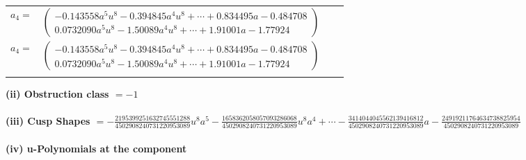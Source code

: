 \documentclass[1p]{elsarticle_modified}
\theoremstyle{definition}
\begin{document}
\begin{tabular}{m{7pt} m{180pt} m{7pt} m{180pt} }
\flushright $a_{4}=$&$\begin{pmatrix}-0.143558 a^{5} u^{8}-0.394845 a^{4} u^{8}+\cdots+0.834495 a-0.484708\\0.0732090 a^{5} u^{8}-1.50089 a^{4} u^{8}+\cdots+1.91001 a-1.77924\end{pmatrix}$\\ \flushright $a_{4}=$&$\begin{pmatrix}-0.143558 a^{5} u^{8}-0.394845 a^{4} u^{8}+\cdots+0.834495 a-0.484708\\0.0732090 a^{5} u^{8}-1.50089 a^{4} u^{8}+\cdots+1.91001 a-1.77924\end{pmatrix}$\\&\end{tabular}
\flushleft \textbf{(ii) Obstruction class $= -1$}\\~\\
\flushleft \textbf{(iii) Cusp Shapes $= -\frac{2195399251632745551288}{4502908240731220953089} u^8 a^5-\frac{1658362058057093286068}{4502908240731220953089} u^8 a^4+\cdots-\frac{3414044045562139416812}{4502908240731220953089} a-\frac{24919211764634738825954}{4502908240731220953089}$}\\~\\
\newpage\renewcommand{\arraystretch}{1}
\flushleft \textbf{(iv) u-Polynomials at the component}\newline \\
\end{document}
